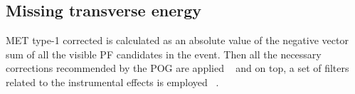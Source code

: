

\subsection{Missing transverse energy}\label{sec:MET}

MET type-1 corrected is calculated as an absolute value of the negative vector sum of all the visible PF candidates in the event. Then all the necessary corrections recommended by the POG are applied ~\cite{MissingETRun2Corrections} and on top, a set of filters related to the instrumental effects is employed ~\cite{MissingETOptionalFiltersRun2}. 
